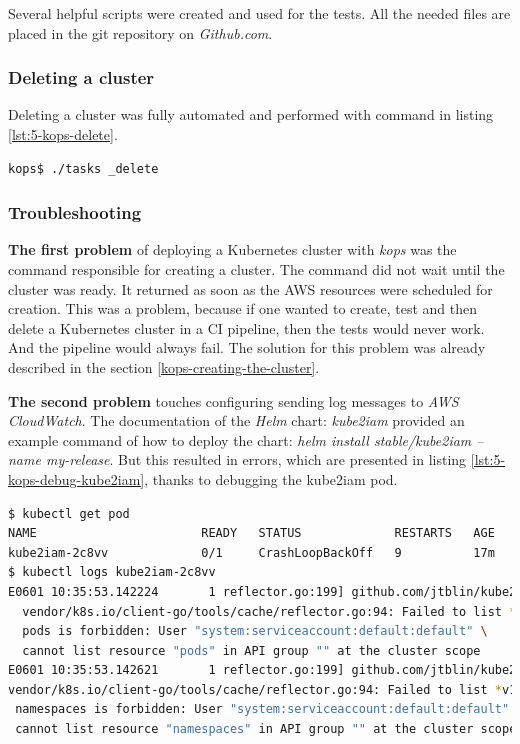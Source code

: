 Several helpful scripts were created and used for the tests. All the needed files are placed in the git repository on \textit{Github.com}.


\subsubsection{Deleting a cluster}

Deleting a cluster was fully automated and performed with command in listing \ref{lst:5-kops-delete}.

\begin{lstlisting}[basicstyle=\scriptsize,xleftmargin=0cm,label=lst:5-kops-delete,caption={Testing a \textit{kops} cluster}]
kops$ ./tasks _delete
\end{lstlisting}

\subsubsection{Troubleshooting}
\label{kops-troubleshooting}

\textbf{The first problem} of deploying a Kubernetes cluster with \textit{kops} was the command responsible for creating a cluster. The command did not wait until the cluster was ready. It returned as soon as the AWS resources were scheduled for creation. This was a problem, because if one wanted to create, test and then delete a Kubernetes cluster in a CI pipeline, then the tests would never work. And the pipeline would always fail. The solution for this problem was already described in the section \ref{kops-creating-the-cluster}.

\textbf{The second problem} touches configuring sending log messages to \textit{AWS CloudWatch}. The documentation of the \textit{Helm} chart: \textit{kube2iam} \cite{kube2iam} provided an example command of how to deploy the chart: \textit{helm install stable/kube2iam --name my-release}. But this resulted in errors, which are presented in listing \ref{lst:5-kops-debug-kube2iam}, thanks to debugging the kube2iam pod.
\begin{lstlisting}[basicstyle=\scriptsize,xleftmargin=0cm,label=lst:5-kops-debug-kube2iam,caption={Debugging kube2iam pod},captionpos=b,language=Bash]
$ kubectl get pod
NAME                       READY   STATUS             RESTARTS   AGE
kube2iam-2c8vv             0/1     CrashLoopBackOff   9          17m
$ kubectl logs kube2iam-2c8vv
E0601 10:35:53.142224       1 reflector.go:199] github.com/jtblin/kube2iam/\
  vendor/k8s.io/client-go/tools/cache/reflector.go:94: Failed to list *v1.Pod:\
  pods is forbidden: User "system:serviceaccount:default:default" \
  cannot list resource "pods" in API group "" at the cluster scope
E0601 10:35:53.142621       1 reflector.go:199] github.com/jtblin/kube2iam/\
vendor/k8s.io/client-go/tools/cache/reflector.go:94: Failed to list *v1.Namespace:\
 namespaces is forbidden: User "system:serviceaccount:default:default" \
 cannot list resource "namespaces" in API group "" at the cluster scope
\end{lstlisting}


